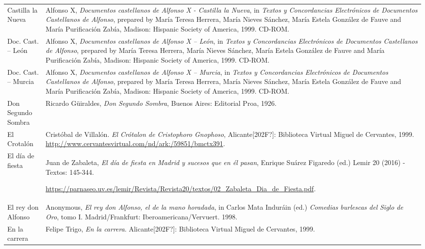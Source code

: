 \documentclass[10pt]{article}
\begin{document}
\begin{flushleft}
\begin{supertabular}{m{1.7955599in}m{4.42126in}}
Castilla la Nueva  &
Alfonso X, \textit{Documentos castellanos de Alfonso X - Castilla la Nueva}, in \textit{Textos y Concordancias Electrónicos de Documentos Castellanos de Alfonso},\textit{ }prepared by María Teresa Herrera, María Nieves Sánchez, María Estela González de Fauve and María Purificación Zabía, Madison: Hispanic Society of America, 1999. CD-ROM.\\
Doc. Cast. – León  &
Alfonso X, \textit{Documentos castellanos de Alfonso X – León}, in \textit{Textos y Concordancias Electrónicos de Documentos Castellanos de Alfonso}, prepared by María Teresa Herrera, María Nieves Sánchez, María Estela González de Fauve and María Purificación Zabía, Madison: Hispanic Society of America, 1999. CD-ROM.\\
Doc. Cast. – Murcia  &
Alfonso X, \textit{Documentos castellanos de Alfonso X – Murcia}, in \textit{Textos y Concordancias Electrónicos de Documentos Castellanos de Alfonso},\textit{ }prepared by María Teresa Herrera, María Nieves Sánchez, María Estela González de Fauve and María Purificación Zabía, Madison: Hispanic Society of America, 1999. CD-ROM.\\
Don Segundo Sombra  &
Ricardo Güiraldes, \textit{Don Segundo Sombra}, Buenos Aires: Editorial Proa, 1926.\\
El Crotalón  &
Cristóbal de Villalón. \textit{El Crótalon de Cristophoro Gnophoso}, Alicante[202F?]: Biblioteca Virtual Miguel de Cervantes, 1999. \url{http://www.cervantesvirtual.com/nd/ark:/59851/bmctx391}.\\
El día de fiesta  &
Juan de Zabaleta,\textit{ El día de fiesta en Madrid y sucesos que en él pasan}, Enrique Suárez Figaredo (ed.) Lemir 20 (2016) - Textos: 145-344.

\url{https://parnaseo.uv.es/lemir/Revista/Revista20/textos/02_Zabaleta_Dia_de_Fiesta.pdf}\textit{.}\\
El rey don Alfonso  &
Anonymous, \textit{El rey don Alfonso, el de la mano horadada}, in Carlos Mata Induráin (ed.) \textit{Comedias burlescas del Siglo de Oro}, tomo I. Madrid/Frankfurt: Iberoamericana/Vervuert. 1998.\\
En la carrera  &
Felipe Trigo,\textit{ En la carrera}. Alicante[202F?]: Biblioteca Virtual Miguel de Cervantes, 1999.


\end{supertabular}
\end{flushleft}
\end{document}
